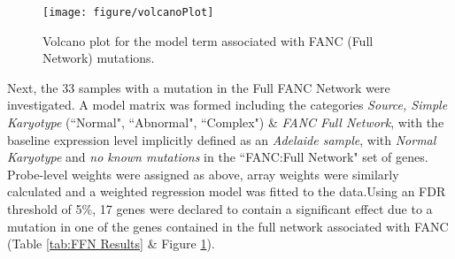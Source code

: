 \documentclass{article}\usepackage{knitr}
\begin{document}
\begin{knitrout}
\color{fgcolor}\begin{figure}[]


{\centering \texttt{[image: figure/volcanoPlot]} 

}

\caption[Volcano plot for the model term associated with FANC (Full Network) mutations]{Volcano plot for the model term associated with FANC (Full Network) mutations.\label{fig:volcanoPlot}}
\end{figure}


\end{knitrout}
Next, the 33 samples with a mutation in the Full FANC Network were investigated.
A model matrix was formed including the categories \textit{Source, Simple Karyotype} (``Normal", ``Abnormal", ``Complex") \& \textit{FANC Full Network}, with the baseline expression level implicitly defined as an \textit{Adelaide sample}, with \textit{Normal Karyotype} and \textit{no known mutations} in the ``FANC:Full Network" set of genes.
Probe-level weights were assigned as above, array weights were similarly calculated and a weighted regression model was fitted to the data.Using an FDR threshold of 5\%, 17 genes were declared to contain a significant effect due to a mutation in one of the genes contained in the full network associated with FANC (Table \ref{tab:FFN Results} \& Figure \ref{fig:volcanoPlot}). 
\end{document}
